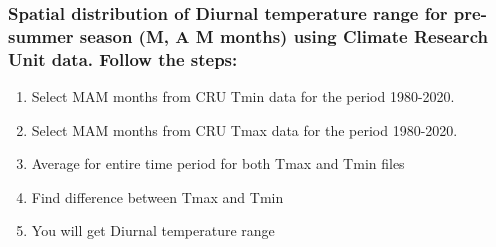 \documentclass[10pt, a4paper]{article}
\begin{document}
\vspace{1cm}
\hline
\vspace{1cm}


\subsubsection*{Spatial distribution of Diurnal temperature range for pre-summer season (M, A
M months) using Climate Research Unit data. Follow the steps:}
\begin{Problem}
\begin{enumerate}
    \item Select MAM months from CRU Tmin data for the period 1980-2020.
    \item Select MAM months from CRU Tmax data for the period 1980-2020.
    \item Average for entire time period for both Tmax and Tmin files
    \item Find difference between Tmax and Tmin
    \item You will get Diurnal temperature range
\end{enumerate}
\end{Problem}
\end{document}

